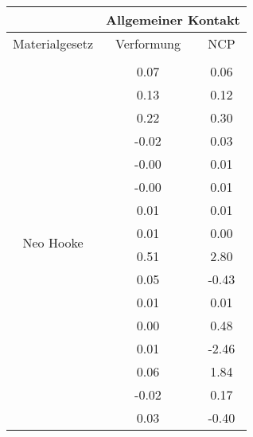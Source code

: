 \begin{table} 
\centering 
\begin{tabular}{c|cc|} 
\cline{2-3} 
 & \multicolumn{2}{|c|}{Allgemeiner Kontakt} \\ 
\hline 
\multicolumn{1}{|c|}{Materialgesetz} & \multicolumn{1}{c|}{Verformung} & \multicolumn{1}{c|}{NCP} \\ 
\hline 
\multicolumn{1}{|c|}{\multirow{101}{*}{Neo Hooke}} &\multicolumn{1}{|c|}{} & \multicolumn{1}{|c|}{} \\ 
\multicolumn{1}{|c|}{} & \multicolumn{1}{|c|}{      0.07} & \multicolumn{1}{|c|}{      0.06} \\ 
\multicolumn{1}{|c|}{} & \multicolumn{1}{|c|}{      0.13} & \multicolumn{1}{|c|}{      0.12} \\ 
\multicolumn{1}{|c|}{} & \multicolumn{1}{|c|}{      0.22} & \multicolumn{1}{|c|}{      0.30} \\ 
\multicolumn{1}{|c|}{} & \multicolumn{1}{|c|}{     -0.02} & \multicolumn{1}{|c|}{      0.03} \\ 
\multicolumn{1}{|c|}{} & \multicolumn{1}{|c|}{     -0.00} & \multicolumn{1}{|c|}{      0.01} \\ 
\multicolumn{1}{|c|}{} & \multicolumn{1}{|c|}{     -0.00} & \multicolumn{1}{|c|}{      0.01} \\ 
\multicolumn{1}{|c|}{} & \multicolumn{1}{|c|}{      0.01} & \multicolumn{1}{|c|}{      0.01} \\ 
\multicolumn{1}{|c|}{} & \multicolumn{1}{|c|}{      0.01} & \multicolumn{1}{|c|}{      0.00} \\ 
\multicolumn{1}{|c|}{} & \multicolumn{1}{|c|}{      0.51} & \multicolumn{1}{|c|}{      2.80} \\ 
\multicolumn{1}{|c|}{} & \multicolumn{1}{|c|}{      0.05} & \multicolumn{1}{|c|}{     -0.43} \\ 
\multicolumn{1}{|c|}{} & \multicolumn{1}{|c|}{      0.01} & \multicolumn{1}{|c|}{      0.01} \\ 
\multicolumn{1}{|c|}{} & \multicolumn{1}{|c|}{      0.00} & \multicolumn{1}{|c|}{      0.48} \\ 
\multicolumn{1}{|c|}{} & \multicolumn{1}{|c|}{      0.01} & \multicolumn{1}{|c|}{     -2.46} \\ 
\multicolumn{1}{|c|}{} & \multicolumn{1}{|c|}{      0.06} & \multicolumn{1}{|c|}{      1.84} \\ 
\multicolumn{1}{|c|}{} & \multicolumn{1}{|c|}{     -0.02} & \multicolumn{1}{|c|}{      0.17} \\ 
\multicolumn{1}{|c|}{} & \multicolumn{1}{|c|}{      0.03} & \multicolumn{1}{|c|}{     -0.40} \\ 

\end{tabular}
\end{table}
